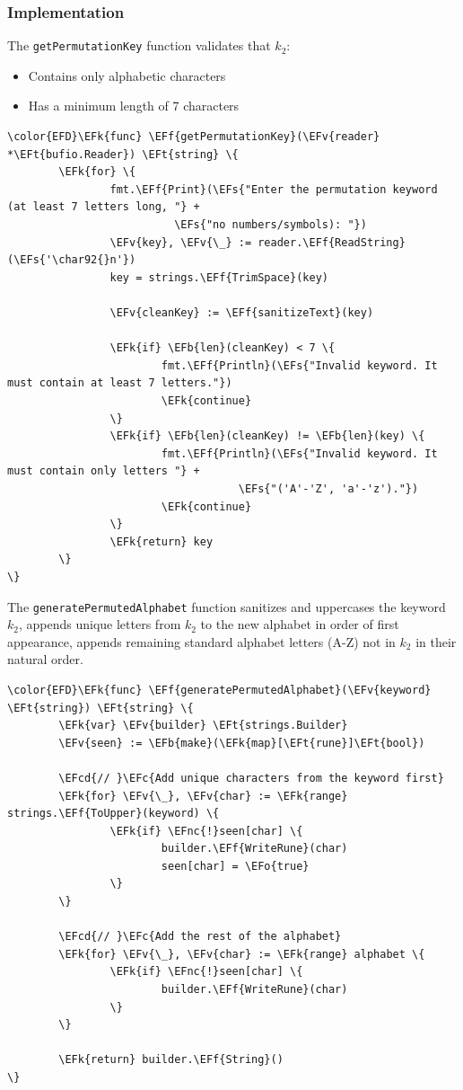 \documentclass[a4paper,12pt]{article}
\newcommand{\EFc}[1]{\textcolor{EFc}{#1}} %
\newcommand{\EFcd}[1]{\textcolor{EFcd}{#1}} %
\newcommand{\EFs}[1]{\textcolor{EFs}{#1}} %
\newcommand{\EFk}[1]{\textcolor{EFk}{#1}} %
\newcommand{\EFb}[1]{\textcolor{EFb}{#1}} %
\newcommand{\EFf}[1]{\textcolor{EFf}{#1}} %
\newcommand{\EFv}[1]{\textcolor{EFv}{#1}} %
\newcommand{\EFt}[1]{\textcolor{EFt}{#1}} %
\newcommand{\EFo}[1]{\textcolor{EFo}{#1}} %
\newcommand{\EFnc}[1]{#1} %
\begin{document}
\subsubsection{Implementation}
\label{sec:org03fcd7c}
The \texttt{getPermutationKey} function validates that \(k_{2}\):
\begin{itemize}
\item Contains only alphabetic characters
\item Has a minimum length of 7 characters
\end{itemize}
\begin{Code}
\begin{Verbatim}
\color{EFD}\EFk{func} \EFf{getPermutationKey}(\EFv{reader} *\EFt{bufio.Reader}) \EFt{string} \{
        \EFk{for} \{
                fmt.\EFf{Print}(\EFs{"Enter the permutation keyword (at least 7 letters long, "} +
                          \EFs{"no numbers/symbols): "})
                \EFv{key}, \EFv{\_} := reader.\EFf{ReadString}(\EFs{'\char92{}n'})
                key = strings.\EFf{TrimSpace}(key)

                \EFv{cleanKey} := \EFf{sanitizeText}(key)

                \EFk{if} \EFb{len}(cleanKey) < 7 \{
                        fmt.\EFf{Println}(\EFs{"Invalid keyword. It must contain at least 7 letters."})
                        \EFk{continue}
                \}
                \EFk{if} \EFb{len}(cleanKey) != \EFb{len}(key) \{
                        fmt.\EFf{Println}(\EFs{"Invalid keyword. It must contain only letters "} +
                                    \EFs{"('A'-'Z', 'a'-'z')."})
                        \EFk{continue}
                \}
                \EFk{return} key
        \}
\}
\end{Verbatim}
\end{Code}
The \texttt{generatePermutedAlphabet} function sanitizes and uppercases the keyword \(k_{2}\), appends unique letters from \(k_{2}\) to the new alphabet in order of first appearance, appends remaining standard alphabet letters (A-Z) not in \(k_{2}\) in their natural order.
\begin{Code}
\begin{Verbatim}
\color{EFD}\EFk{func} \EFf{generatePermutedAlphabet}(\EFv{keyword} \EFt{string}) \EFt{string} \{
        \EFk{var} \EFv{builder} \EFt{strings.Builder}
        \EFv{seen} := \EFb{make}(\EFk{map}[\EFt{rune}]\EFt{bool})

        \EFcd{// }\EFc{Add unique characters from the keyword first}
        \EFk{for} \EFv{\_}, \EFv{char} := \EFk{range} strings.\EFf{ToUpper}(keyword) \{
                \EFk{if} \EFnc{!}seen[char] \{
                        builder.\EFf{WriteRune}(char)
                        seen[char] = \EFo{true}
                \}
        \}

        \EFcd{// }\EFc{Add the rest of the alphabet}
        \EFk{for} \EFv{\_}, \EFv{char} := \EFk{range} alphabet \{
                \EFk{if} \EFnc{!}seen[char] \{
                        builder.\EFf{WriteRune}(char)
                \}
        \}

        \EFk{return} builder.\EFf{String}()
\}
\end{Verbatim}
\end{Code}
\end{document}
